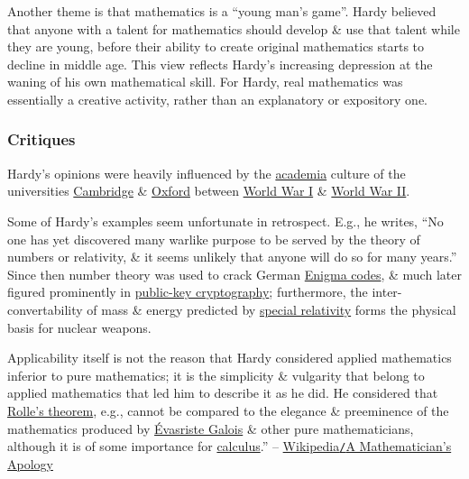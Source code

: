 \documentclass{article}
\begin{document}
Another theme is that mathematics is a ``young man's game''. {\sc Hardy} believed that anyone with a talent for mathematics should develop \& use that talent while they are young, before their ability to create original mathematics starts to decline in middle age. This view reflects {\sc Hardy}'s increasing depression at the waning of his own mathematical skill. For {\sc Hardy}, real mathematics was essentially a creative activity, rather than an explanatory or expository one.

\subsubsection{Critiques}
{\sc Hardy}'s opinions were heavily influenced by the \href{https://en.wikipedia.org/wiki/Academia}{academia} culture of the universities \href{https://en.wikipedia.org/wiki/Cambridge}{Cambridge} \& \href{https://en.wikipedia.org/wiki/Oxford}{Oxford} between \href{https://en.wikipedia.org/wiki/World_War_I}{World War I} \& \href{https://en.wikipedia.org/wiki/World_War_II}{World War II}.

Some of {\sc Hardy}'s examples seem unfortunate in retrospect. E.g., he writes, ``No one has yet discovered many warlike purpose to be served by the theory of numbers or relativity, \& it seems unlikely that anyone will do so for many years.'' Since then number theory was used to crack German \href{https://en.wikipedia.org/wiki/Enigma_machine}{Enigma codes}, \& much later figured prominently in \href{https://en.wikipedia.org/wiki/Public-key_cryptography}{public-key cryptography}; furthermore, the inter-convertability of mass \& energy predicted by \href{https://en.wikipedia.org/wiki/Special_relativity}{special relativity} forms the physical basis for nuclear weapons.

Applicability itself is not the reason that {\sc Hardy} considered applied mathematics inferior to pure mathematics; it is the simplicity \& vulgarity that belong to applied mathematics that led him to describe it as he did. He considered that \href{https://en.wikipedia.org/wiki/Rolle%27s_theorem}{Rolle's theorem}, e.g., cannot be compared to the elegance \& preeminence of the mathematics produced by \href{https://en.wikipedia.org/wiki/%C3%89variste_Galois}{\sc\'Evasriste Galois} \& other pure mathematicians, although it is of some importance for \href{https://en.wikipedia.org/wiki/Calculus}{calculus}.'' -- \href{https://en.wikipedia.org/wiki/A_Mathematician%27s_Apology}{Wikipedia{\tt/}A Mathematician's Apology}
\end{document}
